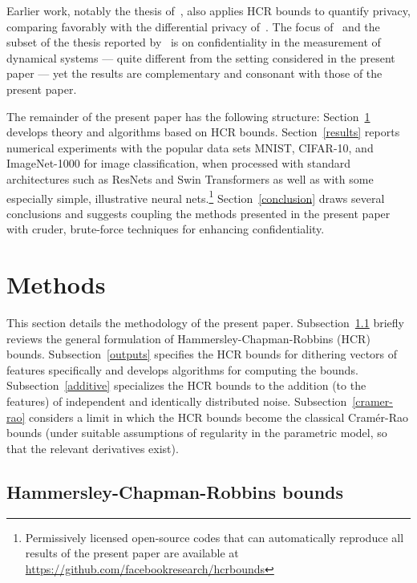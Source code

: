 \documentclass[]{fairmeta}
\begin{document}
Earlier work, notably the thesis of~\cite{alisic}, also applies HCR bounds
to quantify privacy, comparing favorably with the differential privacy
of~\cite{dwork-roth}.
The focus of~\cite{alisic} and the subset of the thesis reported
by~\cite{alisic-molinari-pare-sandberg} is on confidentiality in the measurement
of dynamical systems --- quite different from the setting considered
in the present paper --- yet the results are complementary and consonant
with those of the present paper.

The remainder of the present paper has the following structure:
Section~\ref{methods} develops theory and algorithms based on HCR bounds.
Section~\ref{results} reports numerical experiments with the popular data sets
MNIST, CIFAR-10, and ImageNet-1000 for image classification, when processed
with standard architectures such as ResNets and Swin Transformers
as well as with some especially simple,
illustrative neural nets.\footnote{Permissively licensed open-source codes that
can automatically reproduce all results of the present paper
are available at \url{https://github.com/facebookresearch/hcrbounds}}
Section~\ref{conclusion} draws several conclusions and suggests coupling
the methods presented in the present paper with cruder, brute-force techniques
for enhancing confidentiality.



\section{Methods}
\label{methods}

This section details the methodology of the present paper.
Subsection~\ref{hcrbounds} briefly reviews the general formulation
of Hammersley-Chapman-Robbins (HCR) bounds.
Subsection~\ref{outputs} specifies the HCR bounds for dithering vectors
of features specifically and develops algorithms for computing the bounds.
Subsection~\ref{additive} specializes the HCR bounds to the addition
(to the features) of independent and identically distributed noise.
Subsection~\ref{cramer-rao} considers a limit in which the HCR bounds
become the classical Cram\'er-Rao bounds (under suitable assumptions
of regularity in the parametric model, so that the relevant derivatives exist).


\subsection{Hammersley-Chapman-Robbins bounds}
\label{hcrbounds}
\end{document}
